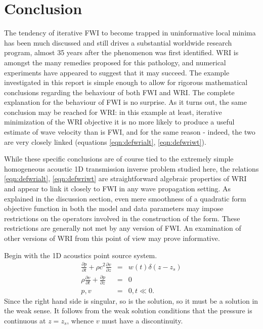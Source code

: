 \section{Conclusion}
The tendency of iterative FWI to become trapped in uninformative local
minima has been much discussed and still drives a substantial
worldwide research program, almost 35 years after the phenomenon was
first identified. WRI is amongst the many remedies proposed for this
pathology, and numerical experiments have appeared to suggest that it
may succeed. The example investigated in this report is simple enough
to allow for rigorous mathematical conclusions regarding the behaviour
of both FWI and WRI. The complete explanation for the behaviour of FWI
is no surprise. As it turns out, the same conclusion may be reached
for WRI: in this example at least, iterative minimization of the WRI
objective it is no more likely to produce a useful estimate of wave
velocity than is FWI, and for the same reason - indeed, the two are
very closely linked (equations \ref{eqn:defwrialt},
\ref{eqn:defwriwt}).

While these specific conclusions are of course tied to the extremely
simple homogeneous acoustic 1D transmission inverse problem studied
here, the relations \ref{eqn:defwrialt}, \ref{eqn:defwriwt} are
straightforward algebraic properties of WRI and appear to link it
closely to FWI in any wave propagation setting. As explained in the
discussion section, even mere smoothness of a quadratic form objective
function in both the model and data parameters may impose restrictions
on the operators involved in the construction of the form. These
restrictions are generally not met by any version of FWI. An
examination of other versions of WRI from this point of view may prove
informative.





Begin with the 1D acoustics point source system. 
\begin{eqnarray}
\label{eqn:awe1dptsrc}
\frac{\partial p}{\partial t} +\rho c^2\frac{\partial 
  v}{\partial z} &=& w(t)\delta(z-z_s) \nonumber\\
\rho \frac{\partial v}{\partial t} + \frac{\partial p}{\partial 
  z}&=&0\nonumber\\
 p,v&=&0, t \ll 0. 
\end{eqnarray}
Since the right hand side is singular, so is the solution, so it must
be a solution in the weak sense. It follows from the weak solution
conditions that the pressure is continuous at $z=z_s$, whence $v$ must
have a discontinuity. 

